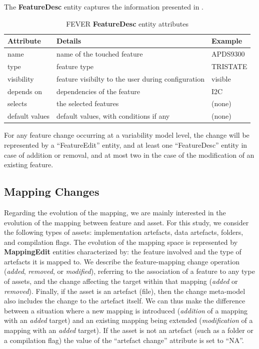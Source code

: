 The \textbf{FeatureDesc} entity captures the information presented in . 
\begin{table}[h]
\centering
\resizebox{\textwidth}{!}
{
\begin{tabular}{|l|l|l|}
\hline
Attribute & Details & Example\\
\hline
name			& name of the touched feature & APDS9300 \\
\hline
type 		& feature type &  TRISTATE \\
\hline
visibility 	& feature visibilty to the user during configuration & visible \\
\hline
depends on  & dependencies of the feature & I2C \\
\hline
selects 	    & the selected features & (none) \\
\hline
default values & default values, with conditions if any & (none) \\ 
\hline
\end{tabular}
}
\caption{FEVER \textbf{FeatureDesc} entity attributes}
\label{featuredesc_attrs}
\end{table}

For any feature change occurring at a variability model level, the change will be represented by a ``FeatureEdit'' entity, and at least one ``FeatureDesc'' entity in case of addition or removal,
and at most two in the case of the modification of an existing feature.


\subsection{Mapping Changes}

Regarding the evolution of the mapping, we are mainly interested in  the evolution of the mapping between feature and asset.
For this study, we consider the following types of assets: implementation artefacts, data artefacts, folders, and compilation flags.
The evolution of the mapping space is represented by \textbf{MappingEdit} entities characterized by:
the feature involved and the type of artefacts it is mapped to.
We describe the feature-mapping change operation (\textit{added}, \textit{removed}, or \textit{modified}),
referring to the association of a feature to any type of assets, and the change affecting the target within that mapping (\textit{added} or \textit{removed}).
Finally, if the asset is an artefact (file), then the change meta-model also includes the change to the artefact itself.
We can thus make the difference between a situation where a new mapping is introduced (\textit{addition} of a mapping with an \textit{added} target)
and an existing mapping being extended (\textit{modification} of a  mapping with an \textit{added} target).
If the asset is not an artefact (such as a folder or a compilation flag) the value of the ``artefact change'' attribute is set to ``NA''.

